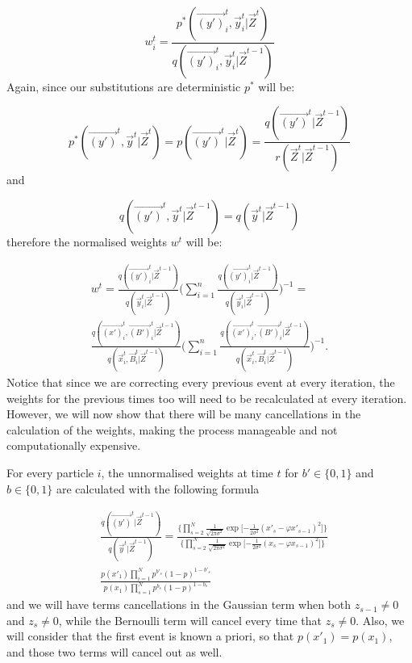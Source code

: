 \begin{equation*}
    w^{t}_i = \frac{p^*(\vec{(y')}^{t}_i, \vec{y}^{t}_i | \vec{Z}^{t})} {q(\vec{(y')}^{t}_i, \vec{y}^{t}_i|\vec{Z}^{t-1})}
\end{equation*}
Again, since our substitutions are deterministic $p^*$ will be:

\begin{equation*}
    p^*(\vec{(y')}^{t}, \vec{y}^{t} | \vec{Z}^{t}) = p(\vec{(y')}^{t} | \vec{Z}^{t}) = \frac{ q(\vec{(y')}^{t}|\vec{Z}^{t-1})} {r(\vec{Z}^{t} | \vec{Z}^{t-1})}
\end{equation*}
and

\begin{equation*}
    q(\vec{(y')}^{t}, \vec{y}^{t} | \vec{Z}^{t-1}) = q(\vec{y}^{t} | \vec{Z}^{t-1})
\end{equation*}
therefore the normalised weights $w^t$ will be:

\begin{multline*}
    w^{t} = \frac{q(\vec{(y')}^{t}_i | \vec{Z}^{t-1}) }{q(\vec{y}^{t}_i | \vec{Z}^{t-1})}\Bigg( \sum_{i=1}^n  \frac{q(\vec{(y')}^{t}_i | \vec{Z}^{t-1}) }{q(\vec{y}^{t}_i | \vec{Z}^{t-1})}\Bigg)^{-1} = \\
    \frac{q(\vec{(x')}^{t}_i, \vec{(B')}^{t}_i | \vec{Z}^{t-1}) }{q(\vec{x}^{t}_i, \vec{B}^{t}_i | \vec{Z}^{t-1})}\Bigg( \sum_{i=1}^n \frac{q(\vec{(x')}^{t}_i, \vec{(B')}^{t}_i | \vec{Z}^{t-1}) }{q(\vec{x}^{t}_i, \vec{B}^{t}_i | \vec{Z}^{t-1})}\Bigg)^{-1}.
\end{multline*}
Notice that since we are correcting every previous event at every iteration, the weights for the previous times too will need to be recalculated at every iteration. However, we will now show that there will be many cancellations in the calculation of the weights, making the process manageable and not computationally expensive.

For every particle $i$, the unnormalised weights at time $t$ for $b' \in \{0,1\}$ and $b \in \{0,1\}$ are calculated with the following formula

\begin{align} \label{eq:2}
    &\frac{q(\vec{(y')}^{t} | \vec{Z}^{t-1}) }{q(\vec{y}^{t} | \vec{Z}^{t-1})} =
    \frac{\bigg \{ \prod_{s=2}^{N}  \frac{1}{\sqrt{2 \pi \sigma^{2}}} \exp \bigg [ { - \frac{1}{2 \sigma^{2}} }  (x'_s - \varphi x'_{s-1})^{2} \bigg ] \bigg \} }{\bigg \{ \prod_{s=2}^{N}  \frac{1}{\sqrt{2 \pi \sigma^{2}}} \exp \bigg [ { - \frac{1}{2 \sigma^{2}} }  (x_s - \varphi x_{s-1})^{2} \bigg ] \bigg \} } \nonumber \\
    &\frac{p(x'_{1}) \prod_{i=1}^{N} p^{b'_s} (1 - p)^{1-b'_s}  }{ p(x_{1}) \prod_{s=1}^{N} p^{b_s} (1 - p)^{1-b_s} }
\end{align}
and we will have terms cancellations in the Gaussian term when both $z_{s-1} \neq 0$ and $z_s \neq 0$, while the Bernoulli term will cancel every time that $z_s \neq 0$. Also, we will consider that the first event is known a priori, so that $p(x'_1)=p(x_1)$, and those two terms will cancel out as well.

